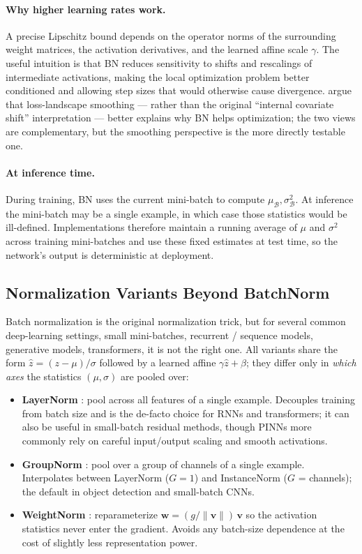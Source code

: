 \documentclass[11pt,a4paper]{report}
\begin{document}
\paragraph{Why higher learning rates work.}  A precise Lipschitz bound depends on the operator norms of the surrounding weight matrices, the activation derivatives, and the learned affine scale $\gamma$.  The useful intuition is that BN reduces sensitivity to shifts and rescalings of intermediate activations, making the local optimization problem better conditioned and allowing step sizes that would otherwise cause divergence.  \citet{santurkar2018how} argue that loss-landscape smoothing — rather than the original ``internal covariate shift'' interpretation — better explains why BN helps optimization; the two views are complementary, but the smoothing perspective is the more directly testable one.

\paragraph{At inference time.}  During training, BN uses the current mini-batch to compute $\mu_{\mathcal B},\sigma^2_{\mathcal B}$.  At inference the mini-batch may be a single example, in which case those statistics would be ill-defined.  Implementations therefore maintain a running average of $\mu$ and $\sigma^2$ across training mini-batches and use these fixed estimates at test time, so the network's output is deterministic at deployment.

\subsection{Normalization Variants Beyond BatchNorm}
\label{sec:normalization_variants}

Batch normalization is the original normalization trick, but for several common deep-learning settings, small mini-batches, recurrent / sequence models, generative models, transformers, it is not the right one.  All variants share the form $\hat z = (z-\mu)/\sigma$ followed by a learned affine $\gamma\hat z + \beta$; they differ only in \emph{which axes} the statistics $(\mu,\sigma)$ are pooled over:

\begin{itemize}[itemsep=3pt]
\item \textbf{LayerNorm} \citep{ba2016layer}: pool across all features of a single example.  Decouples training from batch size and is the de-facto choice for RNNs and transformers; it can also be useful in small-batch residual methods, though PINNs more commonly rely on careful input/output scaling and smooth activations.
\item \textbf{GroupNorm} \citep{wu2018group}: pool over a group of channels of a single example.  Interpolates between LayerNorm ($G\!=\!1$) and InstanceNorm ($G$ = channels); the default in object detection and small-batch CNNs.
\item \textbf{WeightNorm} \citep{salimans2016weight}: reparameterize $\bm w = (g/\|\bm v\|)\,\bm v$ so the activation statistics never enter the gradient.  Avoids any batch-size dependence at the cost of slightly less representation power.
\end{itemize}
\end{document}
